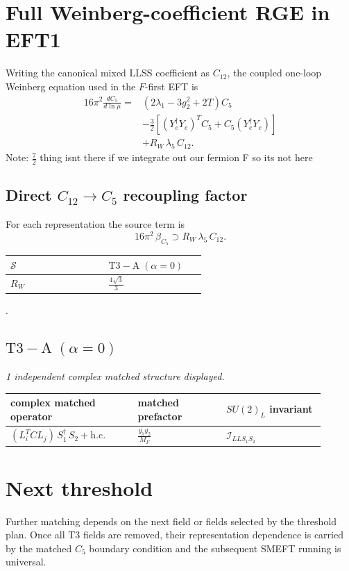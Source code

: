 \documentclass[9pt]{article}
\begin{document}
\section*{Full Weinberg-coefficient RGE in EFT1}
Writing the canonical mixed LLSS coefficient as $C_{12}$, the coupled one-loop Weinberg equation used in the $F$-first EFT is
\begin{align}
16\pi^2\frac{dC_5}{d\ln\mu}={}&(2\lambda_1-3g_2^2+2T)C_5\\
&-\frac32\left[(Y_e^\dagger Y_e)^T C_5+C_5(Y_e^\dagger Y_e)\right]\\
&+R_W\,\lambda_5\,C_{12}.
\end{align}
Note: $\frac{7}{2}$ thing isnt there if we integrate out our fermion F so its not here \subsection*{Direct $C_{12}\to C_5$ recoupling factor}
For each representation the source term is
\[16\pi^2\,\beta_{C_5}\supset R_W\,\lambda_5\,C_{12}.\]
\begin{longtable}{@{}p{0.37\linewidth}p{0.19\linewidth}@{}}
\toprule
$\mathcal{S}$ & $ \mathrm{T3-A}\;(\alpha=0) $ \\
\midrule
$R_W$ & $ \frac{4 \sqrt{3}}{3} $ \\
\bottomrule
\end{longtable}
.
\subsection*{$ \mathrm{T3-A}\;(\alpha=0) $}
\textit{1 independent complex matched structure displayed. }
\begin{longtable}{@{}p{0.36\linewidth}p{0.25\linewidth}p{0.29\linewidth}@{}}
\toprule
complex matched operator & matched prefactor & $SU(2)_L$ invariant \\
\midrule
$ (L_i^T C L_j)\,S_1^\dagger\,S_2+\mathrm{h.c.} $ & $ \frac{\overline{y_{1}} \overline{y_{2}}}{M_F} $ & $ \mathcal{I}_{LLS_1S_2} $ \\
\bottomrule
\end{longtable}
\section*{Next threshold}
Further matching depends on the next field or fields selected by the threshold plan.  Once all T3 fields are removed, their representation dependence is carried by the matched $C_5$ boundary condition and the subsequent SMEFT running is universal.
\end{document}
